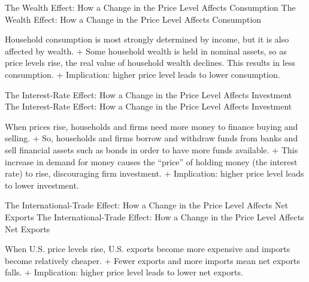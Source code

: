 \documentclass[
  12pt,
  ignorenonframetext,
]{beamer}
\begin{document}
\begin{frame}{The Wealth Effect: How a Change in the Price Level Affects
Consumption}
\protect\hypertarget{the-wealth-effect-how-a-change-in-the-price-level-affects-consumption}{}
The Wealth Effect: How a Change in the Price Level Affects Consumption

Household consumption is most strongly determined by income, but it is
also affected by wealth. + Some household wealth is held in nominal
assets, so as price levels rise, the real value of household wealth
declines. This results in less consumption. + Implication: higher price
level leads to lower consumption.
\end{frame}

\begin{frame}{The Interest-Rate Effect: How a Change in the Price Level
Affects Investment}
\protect\hypertarget{the-interest-rate-effect-how-a-change-in-the-price-level-affects-investment}{}
The Interest-Rate Effect: How a Change in the Price Level Affects
Investment

When prices rise, households and firms need more money to finance buying
and selling. + So, households and firms borrow and withdraw funds from
banks and sell financial assets such as bonds in order to have more
funds available. + This increase in demand for money causes the
``price'' of holding money (the interest rate) to rise, discouraging
firm investment. + Implication: higher price level leads to lower
investment.
\end{frame}

\begin{frame}{The International-Trade Effect: How a Change in the Price
Level Affects Net Exports}
\protect\hypertarget{the-international-trade-effect-how-a-change-in-the-price-level-affects-net-exports}{}
The International-Trade Effect: How a Change in the Price Level Affects
Net Exports

When U.S. price levels rise, U.S. exports become more expensive and
imports become relatively cheaper. + Fewer exports and more imports mean
net exports falls. + Implication: higher price level leads to lower net
exports.
\end{frame}
\end{document}
